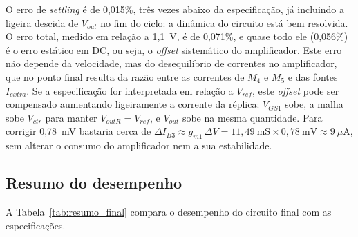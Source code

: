 O erro de \textit{settling} é de 0,015\%, três vezes abaixo da especificação, já incluindo a ligeira descida de $V_{out}$
no fim do ciclo: a dinâmica do circuito está bem resolvida. O erro total, medido em relação a 1,1~V, é de 0,071\%, e quase
todo ele (0,056\%) é o erro estático em DC, ou seja, o \textit{offset} sistemático do amplificador. Este erro não depende
da velocidade, mas do desequilíbrio de correntes no amplificador, que no ponto final resulta da razão entre as correntes
de $M_4$ e $M_5$ e das fontes $I_{extra}$. Se a especificação for interpretada em relação a $V_{ref}$, este
\textit{offset} pode ser compensado aumentando ligeiramente a corrente da réplica: $V_{GS1}$ sobe, a malha sobe $V_{ctr}$
para manter $V_{outR} = V_{ref}$, e $V_{out}$ sobe na mesma quantidade. Para corrigir 0,78~mV bastaria cerca de
$\Delta I_{B3} \approx g_{m1}\,\Delta V = 11{,}49~\text{mS} \times 0{,}78~\text{mV} \approx 9~\mu$A, sem alterar o consumo
do amplificador nem a sua estabilidade.

\subsection{Resumo do desempenho}
\label{subsec:resumo}

A Tabela~\ref{tab:resumo_final} compara o desempenho do circuito final com as especificações.

